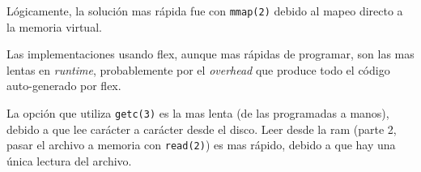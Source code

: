\documentclass[spanish, fleqn]{article}
\begin{document}
Lógicamente, la solución mas rápida fue con \texttt{mmap(2)} debido al mapeo directo a la memoria virtual.

Las implementaciones usando flex, aunque mas rápidas de programar, son las mas lentas en \textit{runtime}, probablemente por el \textit{overhead} que produce todo el código auto-generado por flex.

La opción que utiliza \texttt{getc(3)} es la mas lenta (de las programadas a manos), debido a que lee carácter a carácter desde el disco. Leer desde la ram (parte 2, pasar el archivo a memoria con \texttt{read(2)}) es mas rápido, debido a que hay una única lectura del archivo.
\end{document}
